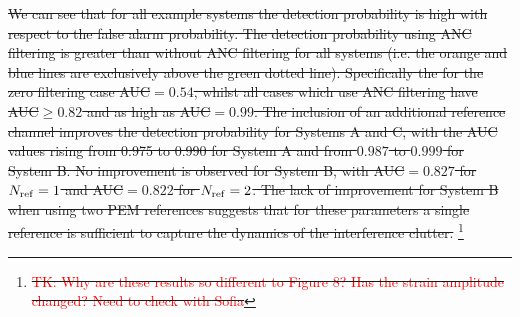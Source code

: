 \documentclass[pra,superscriptaddress,reprint,amsmath,amssymb,nofootinbib]{revtex4-2}
\providecommand{\DIFdeltex}[1]{{\protect\color{red}\sout{#1}}}                      %
\providecommand{\DIFdel}[1]{\texorpdfstring{\DIFdeltex{#1}}{}} %
\begin{document}
\DIFdel{We can see that for all example systems the detection probability is high with respect to the false alarm probability. The detection probability using ANC filtering is greater than without ANC filtering for all systems (i.e. the orange and blue lines are exclusively above the green dotted line). Specifically the for the zero filtering case AUC$=0.54$, whilst all cases which use ANC filtering have AUC$\ge 0.82$ and as high as AUC$=0.99$. The inclusion of an additional reference channel improves the detection probability for Systems A and C, with the AUC values rising from 0.975 to 0.990 for System A and from $0.987$ to $0.999$ for System B. No improvement is observed for System B, with AUC$=0.827$ for $N_{\rm ref} =1$ and AUC$=0.822$ for $N_{\rm ref} =2$. The lack of improvement for System B when using two PEM references suggests that for these parameters a single reference is sufficient to capture the dynamics of the interference clutter. }%
\footnote{%
\DIFdel{\textcolor{red}{TK: Why are these results so different to Figure 8? Has the strain amplitude changed? Need to check with Sofia}}%
}
\addtocounter{footnote}{-1}%
\end{document}
